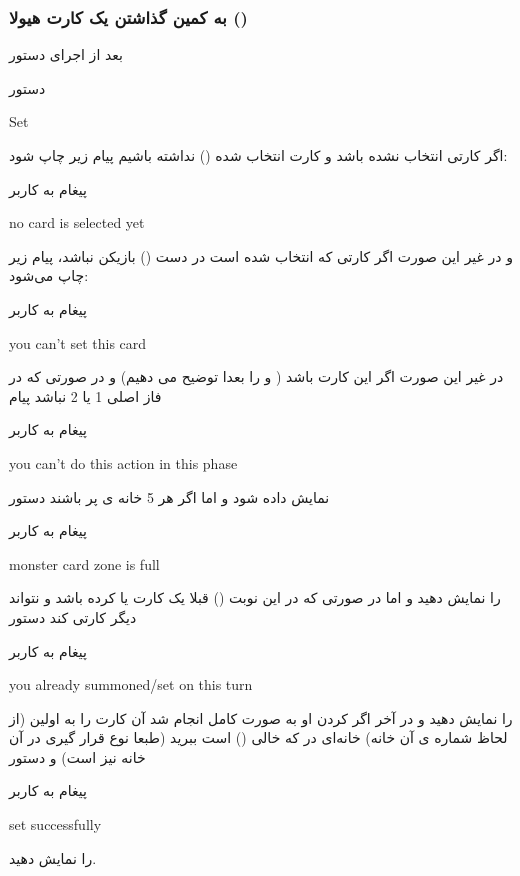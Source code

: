 \documentclass[]{article}
\begin{document}
\subsubsection*{{\titr به کمین گذاشتن یک کارت هیولا ()}}
    بعد از اجرای دستور
\begin{mybox}[colback=yellow]{دستور}
	\begin{latin}	
		Set
	\end{latin}
\end{mybox}
اگر کارتی انتخاب نشده باشد و کارت انتخاب شده () نداشته باشیم 
پیام زیر چاپ شود:
\begin{mybox}[colback=yellow]{پیغام به کاربر}
	\begin{latin}	
		no card is selected yet
	\end{latin}
\end{mybox}
و در غیر این صورت اگر کارتی که انتخاب شده است در دست () بازیکن 
نباشد، پیام زیر چاپ می‌شود:

\begin{mybox}[colback=yellow]{پیغام به کاربر}
	\begin{latin}	
		you can’t set this card
	\end{latin}
\end{mybox}
در غیر این صورت اگر این کارت  باشد ( و  را 
بعدا توضیح می دهیم) و در صورتی که در فاز اصلی 1 یا 2 نباشد پیام
\begin{mybox}[colback=yellow]{پیغام به کاربر}
	\begin{latin}	
		you can’t do this action in this phase
	\end{latin}
\end{mybox}
نمایش داده شود و اما اگر هر 5 خانه ی  پر باشند دستور
\begin{mybox}[colback=yellow]{پیغام به کاربر}
	\begin{latin}	
		monster card zone is full
	\end{latin}
\end{mybox}
را نمایش دهید و اما در صورتی که در این نوبت () قبلا یک کارت 
 یا  کرده باشد و نتواند دیگر کارتی  کند دستور
\begin{mybox}[colback=yellow]{پیغام به کاربر}
	\begin{latin}	
		you already summoned/set on this turn
	\end{latin}
\end{mybox}
را نمایش دهید و در آخر اگر  کردن او به صورت کامل انجام شد آن کارت را 
به اولین (از لحاظ شماره ی آن خانه) خانه‌ای در  که خالی 
() است ببرید (طبعا نوع قرار گیری در آن خانه نیز  است) و 
دستور
\begin{mybox}[colback=yellow]{پیغام به کاربر}
	\begin{latin}	
		set successfully
	\end{latin}
\end{mybox}
را نمایش دهید.
\end{document}
